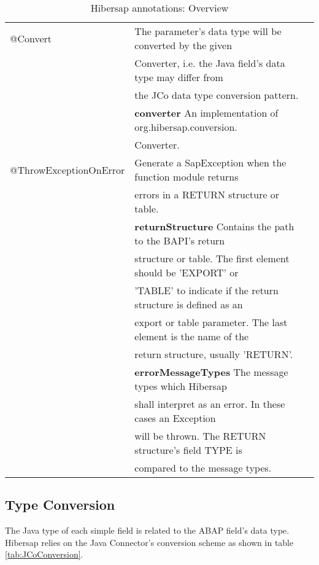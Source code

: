 \begin{table}[H]
\begin{tabular}{lll}
    @Convert                & The parameter's data type will be converted by the given\\
                            & Converter, i.e. the Java field's data type may differ from  \\
                            & the JCo data type conversion pattern.\\
                            & \textbf{converter} An implementation of org.hibersap.conversion.\\
                            & Converter. \\
    @ThrowExceptionOnError  & Generate a SapException when the function module returns \\
                            & errors in a RETURN structure or table. \\
                            & \textbf{returnStructure} Contains the path to the BAPI's return \\
                            & structure or table. The first element should be 'EXPORT' or  \\
                            & 'TABLE' to indicate if the return structure is defined as an \\
                            & export or table parameter. The last element is the name of the  \\
                            & return structure, usually 'RETURN'. \\
                            & \textbf{errorMessageTypes} The message types which Hibersap \\
                            & shall interpret as an error. In these cases an Exception\\
                            & will be thrown. The RETURN structure's field TYPE is \\
                            & compared to the message types.\\
    \bottomrule
  \end{tabular}
  \caption{Hibersap annotations: Overview}
  \label{tab:Annotations}
\end{table}

\subsection{Type Conversion}

The Java type of each simple field is related to the ABAP field's data type.
Hibersap relies on the Java Connector's conversion scheme as shown in table \ref{tab:JCoConversion}.

